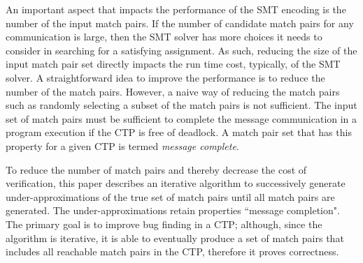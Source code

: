 An important aspect that impacts the performance of the SMT encoding is the number of the input match pairs. 
If the number of candidate match pairs for any communication is large, then the SMT solver has more choices it needs to consider in searching for a satisfying assignment. As such, reducing the size of the input match pair set directly impacts the run time cost, typically, of the SMT solver. 
A straightforward idea to improve the performance is to reduce the number of the match pairs. However, a naive way of reducing the match pairs such as randomly selecting a subset of the match pairs is not sufficient. The input set of match pairs must be sufficient to complete the message communication in a program execution if the CTP is free of deadlock. A match pair set that has this property for a given CTP is termed \emph{message complete}.

To reduce the number of match pairs and thereby decrease the cost of verification, this paper describes an iterative algorithm to successively generate under-approximations of the true set of match pairs until all match pairs are generated. The under-approximations retain properties ``message completion". 
The primary goal is to improve bug finding in a CTP; although, since the algorithm is iterative, it is able to eventually produce a set of match pairs that includes all reachable match pairs in the CTP, therefore it proves correctness. 


